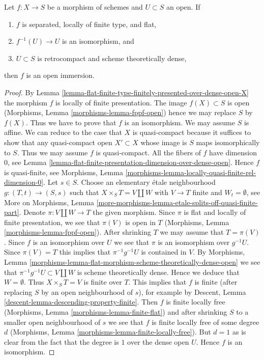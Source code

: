 \begin{lemma}
\label{lemma-zariski}
Let $f : X \to S$ be a morphism of schemes and $U \subset S$ an open. If
\begin{enumerate}
\item $f$ is separated, locally of finite type, and flat,
\item $f^{-1}(U) \to U$ is an isomorphism, and
\item $U \subset S$ is retrocompact and scheme theoretically dense,
\end{enumerate}
then $f$ is an open immersion.
\end{lemma}

\begin{proof}
By Lemma \ref{lemma-flat-finite-type-finitely-presented-over-dense-open-X}
the morphism $f$ is locally of finite presentation.
The image $f(X) \subset S$ is open
(Morphisms, Lemma \ref{morphisms-lemma-fppf-open})
hence we may replace $S$ by $f(X)$. Thus we have to prove that
$f$ is an isomorphism. We may assume $S$ is affine. We can reduce
to the case that $X$ is quasi-compact because it suffices to show
that any quasi-compact open $X' \subset X$ whose image is $S$
maps isomorphically to $S$. Thus we may assume $f$ is quasi-compact.
All the fibers of $f$ have dimension $0$, see
Lemma \ref{lemma-flat-finite-presentation-dimension-over-dense-open}.
Hence $f$ is quasi-finite, see
Morphisms, Lemma \ref{morphisms-lemma-locally-quasi-finite-rel-dimension-0}.
Let $s \in S$. Choose an elementary \'etale
neighbourhood $g : (T, t) \to (S, s)$ such that $X \times_S T = V \amalg W$
with $V \to T$ finite and $W_t = \emptyset$, see
More on Morphisms, Lemma
\ref{more-morphisms-lemma-etale-splits-off-quasi-finite-part}.
Denote $\pi : V \amalg W \to T$ the given morphism. Since $\pi$ is
flat and locally of finite presentation, we see that $\pi(V)$ is
open in $T$ (Morphisms, Lemma \ref{morphisms-lemma-fppf-open}).
After shrinking $T$ we may assume that $T = \pi(V)$.
Since $f$ is an isomorphism over $U$ we see that $\pi$ is an
isomorphism over $g^{-1}U$. Since $\pi(V) = T$ this implies
that $\pi^{-1}g^{-1}U$ is contained in $V$.
By Morphisms, Lemma
\ref{morphisms-lemma-flat-morphism-scheme-theoretically-dense-open}
we see that $\pi^{-1}g^{-1}U \subset V \amalg W$ is scheme theoretically
dense. Hence we deduce that $W = \emptyset$.
Thus $X \times_S T = V$ is finite over $T$.
This implies that $f$ is finite (after replacing $S$ by an
open neighbourhood of $s$), for example by
Descent, Lemma \ref{descent-lemma-descending-property-finite}.
Then $f$ is finite locally free
(Morphisms, Lemma \ref{morphisms-lemma-finite-flat})
and after shrinking $S$ to a smaller open neighbourhood of $s$
we see that $f$ is finite locally free of some degree $d$
(Morphisms, Lemma \ref{morphisms-lemma-finite-locally-free}).
But $d = 1$ as is clear from the fact that the degree is $1$ over
the dense open $U$. Hence $f$ is an isomorphism.
\end{proof}
